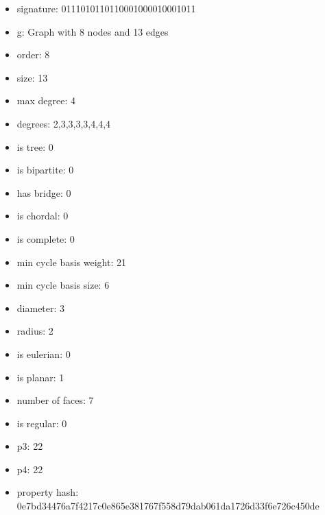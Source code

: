\begin{itemize}
\item signature: 0111010110110001000010001011
\item g: Graph with 8 nodes and 13 edges
\item order: 8
\item size: 13
\item max degree: 4
\item degrees: 2,3,3,3,3,4,4,4
\item is tree: 0
\item is bipartite: 0
\item has bridge: 0
\item is chordal: 0
\item is complete: 0
\item min cycle basis weight: 21
\item min cycle basis size: 6
\item diameter: 3
\item radius: 2
\item is eulerian: 0
\item is planar: 1
\item number of faces: 7
\item is regular: 0
\item p3: 22
\item p4: 22
\item property hash: 0e7bd34476a7f4217c0e865e381767f558d79dab061da1726d33f6e726c450de
\end{itemize}
\newpage
\begin{figure}
\end{figure}
